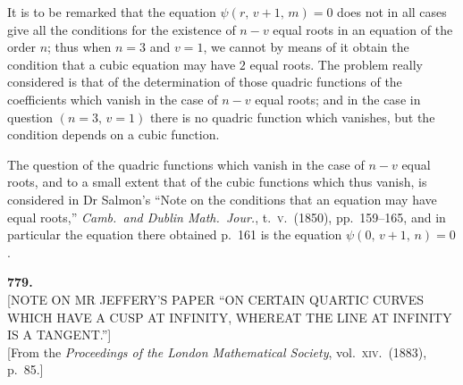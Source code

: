 \documentclass[11pt]{article}
\begin{document}
\medskip
It is to be remarked that the equation $\psi(r,\,v + 1,\,m) = 0$ does not in all cases
give all the conditions for the existence of $n - v$ equal roots in an equation of the
order $n$; thus when $n = 3$ and $v = 1$, we cannot by means of it obtain the condition that
a cubic equation may have $2$ equal roots. The problem really considered is that of
the determination of those quadric functions of the coefficients which vanish in the
case of $n - v$ equal roots; and in the case in question $(n = 3,\,v = 1)$ there is no
quadric function which vanishes, but the condition depends on a cubic function.

The question of the quadric functions which vanish in the case of $n - v$ equal
roots, and to a small extent that of the cubic functions which thus vanish, is considered
in Dr Salmon's ``Note on the conditions that an equation may have equal roots,''
\textit{Camb.\ and Dublin Math.\ Jour.}, t.\ \textsc{v}.\ (1850), pp.\ 159--165, and in particular the
equation there obtained p.\ 161 is the equation $\psi(0,\,v + 1,\,n) = 0$.


\bigskip

\begin{center}
\textbf{779.}\\[4pt]
\textsc{[NOTE ON MR JEFFERY'S PAPER ``ON CERTAIN QUARTIC CURVES WHICH HAVE A CUSP AT INFINITY, WHEREAT THE LINE AT INFINITY IS A TANGENT.'']}\\[4pt]
[From the \textit{Proceedings of the London Mathematical Society}, vol.\ \textsc{xiv}.\ (1883), p.\ 85.]
\end{center}

\bigskip
\end{document}
